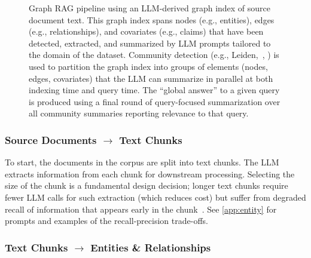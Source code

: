 \documentclass{article}
\begin{document}
\begin{figure}
    \caption{
    Graph RAG pipeline using an LLM-derived graph index of source document text.
    This graph index spans nodes (e.g., entities), edges (e.g., relationships), and covariates (e.g., claims) that have been detected, extracted, and summarized by LLM prompts tailored to the domain of the dataset.
    Community detection (e.g., Leiden,~\citeauthor{Traag2019Leiden}, \citeyear{Traag2019Leiden}) is used to partition the graph index into groups of elements (nodes, edges, covariates) that the LLM can summarize in parallel at both indexing time and query time.
    The ``global answer'' to a given query is produced using a final round of query-focused summarization over all community summaries reporting relevance to that query.
    }
    \label{fig:pipeline}
\end{figure}



\subsubsection{Source Documents \texorpdfstring{\texorpdfstring{$\rightarrow$}{-->}}{-->} Text Chunks}

To start, the documents in the corpus are split into text chunks.
The LLM extracts information from each chunk for downstream processing.
Selecting the size of the chunk is a fundamental design decision; longer text chunks require fewer LLM calls for such extraction (which reduces cost) but suffer from degraded recall of information that appears early in the chunk~\citep{liu-etal:2023:tacl, kuratov2024search}.
See \autoref{app:entity} for prompts and examples of the recall-precision trade-offs.

\subsubsection{Text Chunks \texorpdfstring{$\rightarrow$}{-->} Entities \& Relationships}
\end{document}
